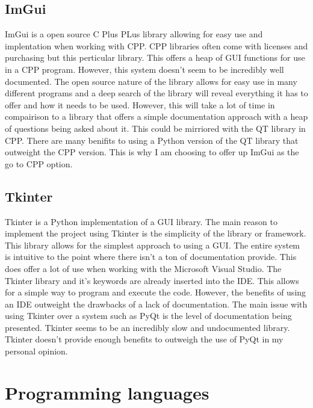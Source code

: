 \documentclass[onecolumn, draftclsnofoot,10pt, compsoc]{IEEEtran}
\begin{document}
      \subsection{ImGui}
      ImGui is a open source C Plus PLus library allowing for easy use and implentation when working with CPP. CPP libraries often come with licenses and purchasing but this perticular library. This offers a heap of GUI functions for use in a CPP program. However, this system doesn't seem to be incredibly well documented. The open source nature of the library allows for easy use in many different programs and a deep search of the library will reveal everything it has to offer and how it needs to be used. However, this will take a lot of time in compairison to a library that offers a simple documentation approach with a heap of questions being asked about it. This could be mirriored with the QT library in CPP. There are many benifits to using a Python version of the QT library that outweight the CPP version. This is why I am choosing to offer up ImGui as the go to CPP option.
      \subsection{Tkinter}
      Tkinter is a Python implementation of a GUI library. The main reason to implement the project using Tkinter is the simplicity of the library or framework. This library allows for the simplest approach to using a GUI. The entire system is intuitive to the point where there isn't a ton of documentation provide. This does offer a lot of use when working with the Microsoft Visual Studio. The Tkinter library and it's keywords are already inserted into the IDE. This allows for a simple way to program and execute the code. However, the benefits of using an IDE outweight the drawbacks of a lack of documentation. The main issue with using Tkinter over a system such as PyQt is the level of documentation being presented. Tkinter seems to be an incredibly slow and undocumented library. Tkinter doesn't provide enough benefits to outweigh the use of PyQt in my personal opinion.

      \section{Programming languages}
\end{document}
